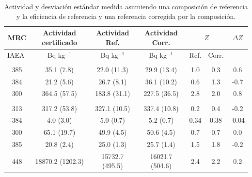 \begin{table}
\centering
\caption{Actividad y desviación estándar medida asumiendo una composición de referencia y la eficiencia de referencia y una referencia corregida por la composición. }\label{Table-ZScoreResultados}
\begin{tabular}{|c|c|c|c|cc|c|}
\hline																					
\rowcolor{Blue3}	MRC	&	Actividad certificado 			&	Actividad Ref.			&	Actividad Corr.			&	\multicolumn{2}{|c|}{$Z$}     			&	$\Delta Z$	\\	\hline
\rowcolor{Blue3}	IAEA-	&	Bq kg$^{-1}$			&	Bq kg$^{-1}$			&	Bq kg$^{-1}$			&	Ref.	&	Corr.	&		\\	\hline
\rowcolor{Blue2}	\multicolumn{7}{|l|}{\PbCero}     																			\\	\hline
\rowcolor{Blue1}	385	&	35.1 (7.8)			&	22.0 (11.3)			&	29.9 (13.4)			&	1.0	&	0.3	&	0.6	\\	
\rowcolor{Blue1}	384	&	21.2 (5.6)			&	26.7 (8.1)			&	36.1 (10.2)			&	0.6	&	1.3	&	-0.7	\\	
\rowcolor{Blue1}	300	&	364.5 (57.5)			&	183.8 (31.1)			&	227.5 (36.5)			&	2.8	&	2.0	&	0.8	\\	\hline
\rowcolor{Blue2}	\multicolumn{7}{|l|}{\PbCuatro}     																			\\	\hline
\rowcolor{Blue1}	313	&	317.2 (53.8)			&	327.1 (10.5)			&	337.4 (10.8)			&	0.2	&	0.4	&	-0.2	\\	\hline
\rowcolor{Blue1}	384	&	4.0 (3.0)			&	5.0 (0.7)			&	5.2 (0.7)			&	0.34	&	0.38	&	-0.04	\\	\hline
\rowcolor{Blue1}	300	&	65.1 (19.7)			&	49.9 (4.5)			&	50.6 (4.5)			&	0.7	&	0.7	&	0.0	\\	\hline
\rowcolor{Blue1}	385	&	20.8 (2.4)			&	25.0 (1.3)			&	25.7 (1.4)			&	1.5	&	1.8	&	-0.2	\\	\hline
\rowcolor{Blue1}	448	&	18870.2 (1202.3)			&	15732.7 (495.5)			&	16021.7 (504.6)			&	2.4	&	2.2	&	0.2	\\	\hline

\end{tabular}
\end{table}
